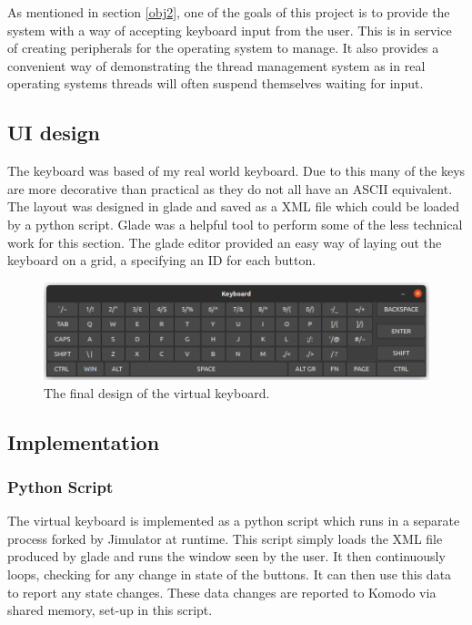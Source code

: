 \label{chap:virtualKeyboard}
As mentioned in section \ref{obj2}, one of the goals of this project is to provide the system with a way of accepting keyboard input from the user. This is in service of creating peripherals for the operating system to manage. It also provides a convenient way of demonstrating the thread management system as in real operating systems threads will often suspend themselves waiting for input.
\subsection{UI design}
The keyboard was based of my real world keyboard. Due to this many of the keys are more decorative than practical as they do not all have an ASCII \cite{ascii} equivalent. The layout was designed in glade \cite{glade} and saved as a XML file which could be loaded by a python script. Glade was a helpful tool to perform some of the less technical work for this section. The glade editor provided an easy way of laying out the keyboard on a grid, a specifying an ID for each button. 


\begin{figure}[ht!]
	\includegraphics[width=\linewidth]{figures/keyboard.png}
	\caption{The final design of the virtual keyboard.}
	\label{fig:keyboard}
\end{figure} 

\subsection{Implementation}
\subsubsection{Python Script}
The virtual keyboard is implemented as a python \cite{python} script which runs in a separate process forked by Jimulator at runtime. This script simply loads the XML file produced by glade and runs the window seen by the user. It then continuously loops, checking for any change in state of the buttons. It can then use this data to report any state changes.  These data changes are reported to Komodo via shared memory, set-up in this script.
